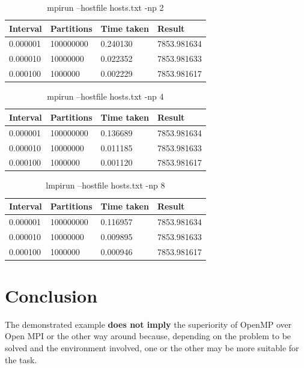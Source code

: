 \begin{table}[h]
	\caption{mpirun --hostfile hosts.txt -np 2}
	\begin{center}
		\begin{tabular}{|l|l|l|l|}
			\hline
			Interval & Partitions & Time taken & Result \\
			\hline
			0.000001 & 100000000 & 0.240130 & 7853.981634 \\
			0.000010 & 10000000 & 0.022352 & 7853.981633 \\
			0.000100 & 1000000 & 0.002229 & 7853.981617 \\
			\hline
		\end{tabular}
	\end{center}
\end{table}

\begin{table}[h]
	\caption{mpirun --hostfile hosts.txt -np 4}
	\begin{center}
		\begin{tabular}{|l|l|l|l|}
			\hline
			Interval & Partitions & Time taken & Result \\
			\hline
			0.000001 & 100000000 & 0.136689 & 7853.981634 \\
			0.000010 & 10000000 & 0.011185 & 7853.981633 \\
			0.000100 & 1000000 & 0.001120 & 7853.981617 \\
			\hline
		\end{tabular}
	\end{center}
\end{table}

\begin{table}[h]
	\caption{lmpirun --hostfile hosts.txt -np 8}
	\begin{center}
		\begin{tabular}{|l|l|l|l|}
			\hline
			Interval & Partitions & Time taken & Result \\
			\hline
			0.000001 & 100000000 & 0.116957 & 7853.981634 \\
			0.000010 & 10000000 & 0.009895 & 7853.981633 \\
			0.000100 & 1000000 & 0.000946 & 7853.981617 \\
			\hline
	\end{tabular}
	\end{center}
\end{table}
	
	\section{Conclusion}
		\par The demonstrated example \textbf{does not imply} the superiority of OpenMP over Open MPI or the other way around because, depending on the problem to be solved and the environment involved, one or the other may be more suitable for the task.
		
